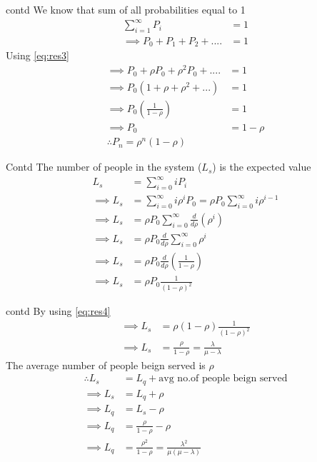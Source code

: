 \documentclass{beamer}
\providecommand{\brak}[1]{\ensuremath{\left(#1\right)}}
\begin{document}
\begin{frame}{contd}
We know that sum of all probabilities equal to 1
\begin{align}
    \sum_{i=1}^{\infty}P_i&=1\\
    \implies P_0+P_1+P_2+....&=1
\end{align}
Using \eqref{eq:res3}
\begin{align}
    \implies P_0+\rho P_0+\rho^2P_0+....&=1\\
    \implies P_0\brak{1+\rho+\rho^2+...}&=1\\
    \implies P_0\brak{\frac{1}{1-\rho}}&=1\\
    \implies P_0&=1-\rho\label{eq:res4}\\
    \therefore P_n=\rho^n(1-\rho)
\end{align}
\end{frame}
\begin{frame}{Contd}
The number of people in the system ($L_s$) is the expected value
\begin{align}
    L_s&=\sum_{i=0}^{\infty}iP_i\\
    \implies L_s&=\sum_{i=0}^{\infty}i\rho^iP_0=\rho P_0\sum_{i=0}^{\infty}i\rho^{i-1}\\
    \implies L_s&=\rho P_0\sum_{i=0}^{\infty}\frac{d}{d\rho}\brak{\rho^i}\\
    \implies L_s&=\rho P_0\frac{d}{d\rho}\sum_{i=0}^{\infty}\rho^i\\
    \implies L_s&=\rho P_0\frac{d}{d\rho}\brak{\frac{1}{1-\rho}}\\
    \implies L_s&=\rho P_0\frac{1}{(1-\rho)^2}
\end{align}
\end{frame}
\begin{frame}{contd}
By using \eqref{eq:res4}
\begin{align}
    \implies L_s&=\rho(1-\rho)\frac{1}{(1-\rho)^2}\\
    \implies L_s&=\frac{\rho}{1-\rho}=\frac{\lambda}{\mu-\lambda}
\end{align}
The average number of people beign served is $\rho$
\begin{align}
    \therefore L_s&=L_q+\text{avg no.of people beign served}\\
    \implies L_s&=L_q+\rho\\
    \implies L_q&=L_s-\rho\\
    \implies L_q&=\frac{\rho}{1-\rho}-\rho\\
    \implies L_q&=\frac{\rho^2}{1-\rho}=\frac{\lambda^2}{\mu(\mu-\lambda)}
\end{align}
\end{frame}
\end{document}
